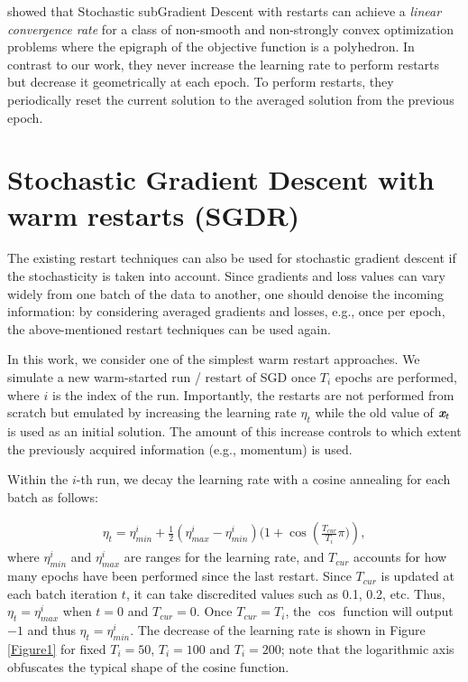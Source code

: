 \documentclass{article}
\newcommand{\vc}[1]{\textit{\textbf{#1}}}
\begin{document}
\cite{yang2015stochastic} showed that Stochastic subGradient Descent with restarts can achieve a \textit{linear convergence rate} for a class of non-smooth and non-strongly convex optimization problems where the epigraph of the objective function is a polyhedron. In contrast to our work, they never increase the learning rate to perform restarts but decrease it geometrically at each epoch. To perform restarts, they periodically reset the current solution to the averaged solution from the previous epoch. 

\section{Stochastic Gradient Descent with warm restarts (SGDR)}

The existing restart techniques can also be used for stochastic gradient descent if the stochasticity is taken into account. Since gradients and loss values can vary widely from one batch of the data to another, one should denoise the incoming information: by considering  averaged gradients and losses, e.g., once per epoch, the above-mentioned restart techniques can be used again. 

In this work, we consider one of the simplest warm restart approaches. We simulate a new warm-started run / restart of SGD once $T_i$ epochs are performed, where $i$ is the index of the run. Importantly, the restarts are not performed from scratch but emulated by increasing the learning rate $\eta_t$ while the old value of $\vc{x}_{t}$ is used as an initial solution. The amount of this increase controls to which extent the previously acquired information (e.g., momentum) is used. 

Within the $i$-th run, we decay the learning rate with a cosine annealing for each batch as follows:

\begin{eqnarray}
	\label{eq:t}
	\eta_t = \eta^i_{min} + \frac{1}{2}(\eta^i_{max} - \eta^i_{min}) (1 + \cos({\frac{T_{cur}}{T_i} \pi)}),	
\end{eqnarray}
where $\eta^i_{min}$ and $\eta^i_{max}$ are ranges for the learning rate, and 
$T_{cur}$ accounts for how many epochs have been performed since the last restart. 
Since $T_{cur}$ is updated at each batch iteration $t$, it can take discredited values such as 0.1, 0.2, etc.
Thus, $\eta_t = \eta^i_{max}$ when $t=0$ and $T_{cur}=0$. 
Once $T_{cur}=T_i$, the $\cos{}$ function will output $-1$ and thus $\eta_t = \eta^i_{min}$. 
The decrease of the learning rate is shown in Figure \ref{Figure1} for fixed $T_i=50$, $T_i=100$ and $T_i=200$; note that the logarithmic axis obfuscates the typical shape of the cosine function.
\end{document}
